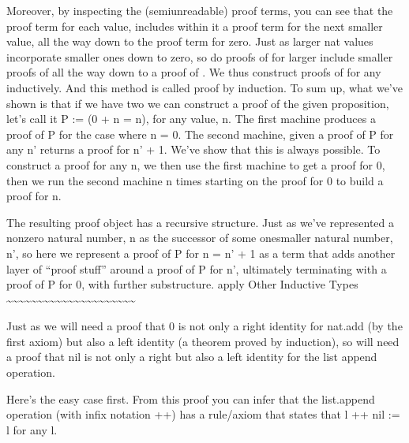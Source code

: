 \documentclass[letterpaper,10pt,english]{sphinxmanual}
\begin{document}
\sphinxAtStartPar
Moreover, by inspecting the (semi\sphinxhyphen{}unreadable)
proof terms, you can see that the proof term for each value,
 includes within it a proof term for the next smaller
value, all the way down to the proof term for zero. Just
as larger nat values incorporate smaller ones down to zero,
so do proofs of  for larger  include smaller
proofs of  all the way down to a proof of .
We thus construct proofs of  for any  inductively.
And this method is called proof by induction.
To sum up, what we’ve shown is that if we have two
 we can construct a proof of the
given proposition, let’s call it P := (0 + n = n),
for any value, n. The first machine produces a proof
of P for the case where n = 0. The second machine,
given a proof of P for any n’ returns a proof for
n’ + 1. We’ve show that this is always possible. To
construct a proof for any n, we then use the first
machine to get a proof for 0, then we run the second
machine n times starting on the proof for 0 to build
a proof for n.

\sphinxAtStartPar
The resulting proof object has a recursive structure.
Just as we’ve represented a non\sphinxhyphen{}zero natural number,
n as the successor of some one\sphinxhyphen{}smaller natural number,
n’, so here we represent a proof of P for n = n’ + 1
as a term that adds another layer of “proof stuff”
around a proof of P for n’, ultimately terminating
with a proof of P for 0, with further sub\sphinxhyphen{}structure.
apply
Other Inductive Types
\textasciitilde{}\textasciitilde{}\textasciitilde{}\textasciitilde{}\textasciitilde{}\textasciitilde{}\textasciitilde{}\textasciitilde{}\textasciitilde{}\textasciitilde{}\textasciitilde{}\textasciitilde{}\textasciitilde{}\textasciitilde{}\textasciitilde{}\textasciitilde{}\textasciitilde{}\textasciitilde{}\textasciitilde{}\textasciitilde{}\textasciitilde{}

\sphinxAtStartPar
Just as we will need a proof that 0 is not only a right
identity for nat.add (by the first axiom) but also a left
identity (a theorem proved by induction), so will need a
proof that nil is not only a right but also a left identity
for the list append operation.

\sphinxAtStartPar
Here’s the easy case first. From this proof you can infer
that the list.append operation (with infix notation ++) has
a rule/axiom that states that l ++ nil := l for any l.
\end{document}

